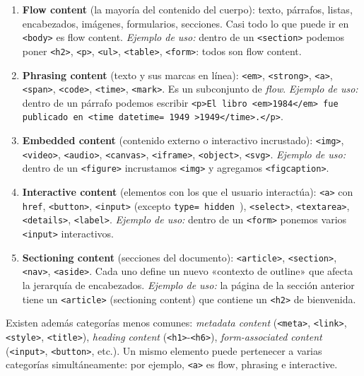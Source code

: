 \documentclass[11pt,a4paper,openany]{book}
\begin{document}
\begin{enumerate}
\item \textbf{Flow content} (la mayoría del contenido del cuerpo):
texto, párrafos, listas, encabezados, imágenes, formularios,
secciones. Casi todo lo que puede ir en \texttt{<body>} es flow
content. \emph{Ejemplo de uso:} dentro de un \texttt{<section>}
podemos poner \texttt{<h2>}, \texttt{<p>}, \texttt{<ul>},
\texttt{<table>}, \texttt{<form>}: todos son flow content.

\item \textbf{Phrasing content} (texto y sus marcas en línea):
\texttt{<em>}, \texttt{<strong>}, \texttt{<a>}, \texttt{<span>},
\texttt{<code>}, \texttt{<time>}, \texttt{<mark>}. Es un subconjunto
de \emph{flow}. \emph{Ejemplo de uso:} dentro de un párrafo podemos
escribir \texttt{<p>El libro <em>1984</em> fue publicado en
<time datetime= 1949 >1949</time>.</p>}.

\item \textbf{Embedded content} (contenido externo o interactivo
incrustado): \texttt{<img>}, \texttt{<video>}, \texttt{<audio>},
\texttt{<canvas>}, \texttt{<iframe>}, \texttt{<object>},
\texttt{<svg>}. \emph{Ejemplo de uso:} dentro de un \texttt{<figure>}
incrustamos \texttt{<img>} y agregamos \texttt{<figcaption>}.

\item \textbf{Interactive content} (elementos con los que el usuario
interactúa): \texttt{<a>} con \texttt{href}, \texttt{<button>},
\texttt{<input>} (excepto \texttt{type= hidden }), \texttt{<select>},
\texttt{<textarea>}, \texttt{<details>}, \texttt{<label>}.
\emph{Ejemplo de uso:} dentro de un \texttt{<form>} ponemos
varios \texttt{<input>} interactivos.

\item \textbf{Sectioning content} (secciones del documento):
\texttt{<article>}, \texttt{<section>}, \texttt{<nav>},
\texttt{<aside>}. Cada uno define un nuevo «contexto de outline» que
afecta la jerarquía de encabezados. \emph{Ejemplo de uso:} la
página de la sección anterior tiene un \texttt{<article>} (sectioning
content) que contiene un \texttt{<h2>} de bienvenida.
\end{enumerate}

Existen además categorías menos comunes: \emph{metadata content}
(\texttt{<meta>}, \texttt{<link>}, \texttt{<style>}, \texttt{<title>}),
\emph{heading content} (\texttt{<h1>}-\texttt{<h6>}), \emph{form-associated
content} (\texttt{<input>}, \texttt{<button>}, etc.). Un mismo
elemento puede pertenecer a varias categorías simultáneamente: por
ejemplo, \texttt{<a>} es flow, phrasing e interactive.
\end{document}
